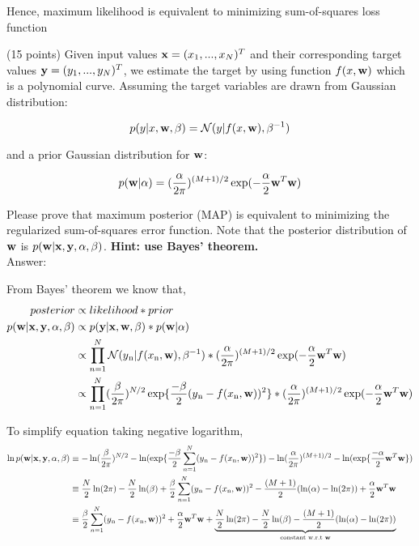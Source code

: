 \documentclass{exam}
\newcommand{\xx}{{\bf{x}}}
\newcommand{\yy}{{\bf{y}}}
\newcommand{\ww}{{\bf{w}}}
\begin{document}
\begin{questions}
Hence, maximum likelihood is equivalent to minimizing sum-of-squares loss function

\newpage
{} (15 points) Given input values $\xx= (x_1,...,x_N)^T$ and their corresponding target values $\yy= (y_1,...,y_N)^T$, we estimate the target by using function $f(x,\ww)$ which is a polynomial curve. Assuming the target variables are drawn from Gaussian distribution:

$$p(y|x, \ww,\beta) = \mathcal{N} (y | f(x,\ww), \beta^{-1})$$

and  a prior Gaussian distribution for $\ww$:

$$p(\ww|\alpha) = (\frac{\alpha}{2\pi})^{(M+1)/2} \exp(-\frac{\alpha}{2} \ww^T\ww)$$

Please prove that maximum posterior (MAP) is equivalent to minimizing the regularized sum-of-squares error function. Note that the posterior distribution of $\ww$ is $p(\ww|\xx,\yy,\alpha,\beta)$. \textbf{Hint: use Bayes' theorem.} \\

Answer:
    
From Bayes' theorem we know that,  
\begin{align}   
posterior &\propto likelihood * prior \\
p(\ww|\xx,\yy,\alpha,\beta) &\propto p(\yy|\xx, \ww,\beta) * p(\ww|\alpha) \\
&\propto \prod_{n=1}^N \mathcal{N} (y\textsubscript{n} | f(x\textsubscript{n},\ww), \beta^{-1}) *  (\frac{\alpha}{2\pi})^{(M+1)/2} 
\exp(-\frac{\alpha}{2} \ww^T\ww) \\
&\propto \prod_{n=1}^N (\frac{\beta}{2\pi})^{N/2} \exp\{{\frac{-\beta}{2}(y\textsubscript{n}-f(x\textsubscript{n},\ww))^2}\} *  (\frac{\alpha}{2\pi})^{(M+1)/2} \exp(-\frac{\alpha}{2} \ww^T\ww)
\end{align}

To simplify equation taking negative logarithm,
\begin{align}
\ln{p(\ww|\xx,\yy,\alpha,\beta)}  
&\equiv -\ln(\frac{\beta}{2\pi})^{N/2} -\ln(\exp\{\frac{-\beta}{2}\sum_{n=1}^N(y\textsubscript{n}-f(x\textsubscript{n},\ww))^2\})  
-\ln(\frac{\alpha}{2\pi})^{(M+1)/2} -\ln(\exp\{\frac{-\alpha}{2}\ww^T\ww\}) \\
&\equiv \frac{N}{2}\ln(2\pi) -\frac{N}{2}\ln(\beta) + \frac{\beta}{2}\sum_{n=1}^N
(y\textsubscript{n}-f(x\textsubscript{n},\ww))^2  
- \frac{(M+1)}{2}(\ln(\alpha)-\ln(2\pi)) + \frac{\alpha}{2}\ww^T\ww \\
&\equiv  \frac{\beta}{2}\sum_{n=1}^N (y\textsubscript{n}-f(x\textsubscript{n},\ww))^2 + \frac{\alpha}{2}\ww^T\ww
+ \underbrace{\frac{N}{2}\ln(2\pi) -\frac{N}{2}\ln(\beta) - \frac{(M+1)}{2}(\ln(\alpha)-\ln(2\pi))}_{\text{constant w.r.t \ww}} 
\end{align}


\end{questions}
\end{document}
